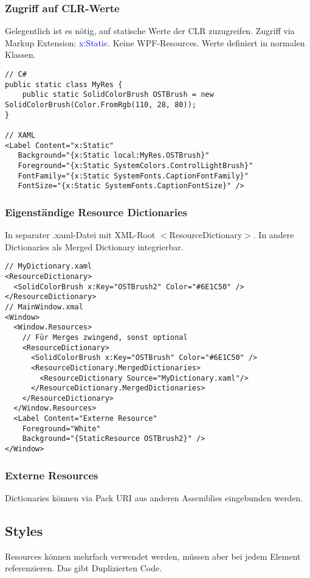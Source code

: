 \subsubsection{Zugriff auf CLR-Werte}
Gelegentlich ist es nötig, auf statische Werte der CLR zuzugreifen. Zugriff via Markup Extension: \textcolor{blue}{x:Static}. Keine WPF-Resources. Werte definiert in normalen Klassen.
\begin{lstlisting}
// C#
public static class MyRes {
    public static SolidColorBrush OSTBrush = new SolidColorBrush(Color.FromRgb(110, 28, 80));
}

// XAML
<Label Content="x:Static"
   Background="{x:Static local:MyRes.OSTBrush}"
   Foreground="{x:Static SystemColors.ControlLightBrush}"
   FontFamily="{x:Static SystemFonts.CaptionFontFamily}"
   FontSize="{x:Static SystemFonts.CaptionFontSize}" />
\end{lstlisting}
\subsubsection{Eigenständige Resource Dictionaries}
In separater .xaml-Datei mit XML-Root $<$ResourceDictionary$>$. In andere Dictionaries als Merged Dictionary integrierbar.
\begin{lstlisting}
// MyDictionary.xaml
<ResourceDictionary>
  <SolidColorBrush x:Key="OSTBrush2" Color="#6E1C50" />
</ResourceDictionary>
// MainWindow.xmal
<Window>
  <Window.Resources>
    // Für Merges zwingend, sonst optional
    <ResourceDictionary>
      <SolidColorBrush x:Key="OSTBrush" Color="#6E1C50" />
      <ResourceDictionary.MergedDictionaries>
        <ResourceDictionary Source="MyDictionary.xaml"/>
      </ResourceDictionary.MergedDictionaries>
    </ResourceDictionary>
  </Window.Resources>
  <Label Content="Externe Resource"
    Foreground="White"
    Background="{StaticResource OSTBrush2}" />
</Window>
\end{lstlisting}
\subsubsection{Externe Resources}
Dictionaries können via Pack URI aus anderen Assemblies eingebunden werden.

\subsection{Styles}
Resources können mehrfach verwendet werden, müssen aber bei jedem Element referenzieren. Das gibt Duplizierten Code.
